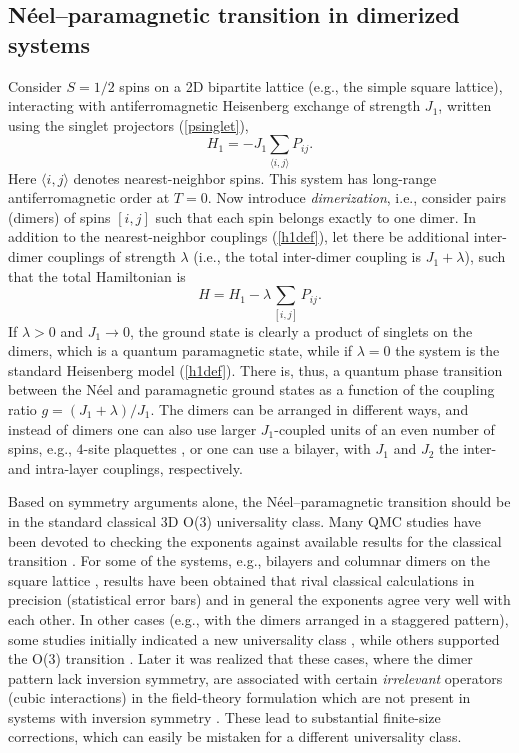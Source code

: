 \documentclass[range]{ar2e}
\begin{document}
\subsection{N\'eel--paramagnetic transition in dimerized systems}

Consider $S=1/2$ spins on a 2D bipartite lattice (e.g., the simple square lattice), interacting with antiferromagnetic Heisenberg exchange of 
strength $J_1$, written using the singlet projectors (\ref{psinglet}),
\begin{equation}
H_1 = -J_1 \sum_{\langle i,j\rangle} P_{ij}.
\label{h1def}
\end{equation}
Here $\langle i,j\rangle$ denotes nearest-neighbor spins. This system has long-range antiferromagnetic order at $T=0$. Now introduce {\it dimerization}, 
i.e., consider pairs (dimers) of spins $[i,j]$ such that each spin belongs exactly to one dimer. In addition to the nearest-neighbor couplings (\ref{h1def}),
let there be additional inter-dimer couplings of strength $\lambda$ (i.e., the total inter-dimer coupling is $J_1+\lambda$), such that the total Hamiltonian is
\begin{equation}
H = H_1  -\lambda \sum_{[ i,j]} P_{ij} .
\end{equation}
If $\lambda>0$ and $J_1\to 0$, the ground state is clearly a product of singlets on the dimers, which is a quantum paramagnetic state, while if $\lambda=0$ 
the system is the standard Heisenberg model (\ref{h1def}). There is, thus, a quantum phase transition between the N\'eel and paramagnetic ground states as a 
function of the coupling ratio $g=(J_1+\lambda)/J_1$. The dimers can be arranged in different ways, and instead of dimers one can also use larger $J_1$-coupled 
units of an even number of spins, e.g., $4$-site plaquettes , or one can use a bilayer, with $J_1$ and $J_2$ the inter-and intra-layer couplings, respectively.

Based on symmetry arguments alone, the N\'eel--paramagnetic transition should be in the standard classical 3D O($3$) universality class. Many QMC studies 
have been devoted to checking the exponents against available results for the classical transition \cite{Sandvik94,Troyer96,Matsumoto01,Wang06,Wenzel08,Wenzel09}.
For some of the systems, e.g., bilayers \cite{Wang06} and columnar dimers on the square lattice \cite{Matsumoto01,Wenzel09,Sandvik10b}, results have been 
obtained that rival classical calculations in precision (statistical error bars) and in general the exponents agree very well with each other. In other 
cases (e.g., with the dimers arranged in a staggered pattern), some studies initially indicated a new universality class \cite{Wenzel08}, while others
supported the O($3$) transition \cite{Jiang12}.  Later it was realized that these cases, where the dimer pattern lack inversion symmetry, are associated with certain
{\it irrelevant} operators (cubic interactions) in the field-theory formulation which are not present in systems with inversion symmetry \cite{Fritz11}. 
These lead to substantial finite-size corrections, which can easily be mistaken for a different universality class.
\end{document}
